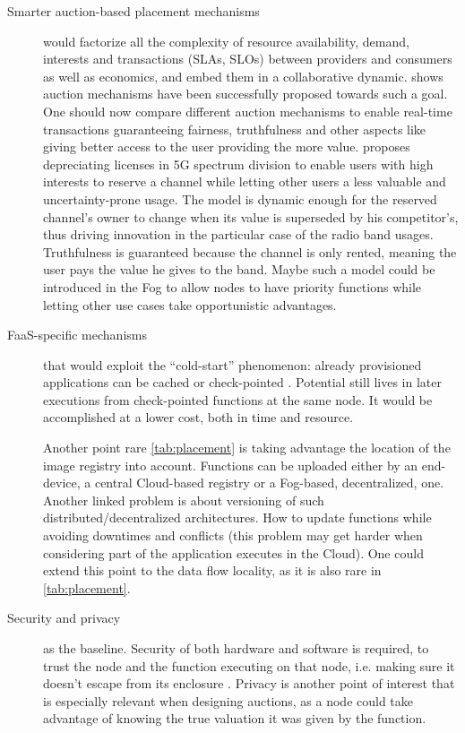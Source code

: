 \documentclass[11pt]{sdm}
\begin{document}
\begin{description}
	\item[Smarter auction-based placement mechanisms] would factorize all the complexity of resource availability, demand, interests and transactions (\glspl{SLA}, \glspl{SLO}) between providers and consumers as well as economics, and embed them in a collaborative dynamic.  shows auction mechanisms have been successfully proposed towards such a goal. One should now compare different auction mechanisms to enable real-time transactions guaranteeing fairness, truthfulness and other aspects like giving better access to the user providing the more value. \citet{milgrom_redesigning_2017} proposes depreciating licenses in 5G spectrum division to enable users with high interests to reserve a channel while letting other users a less valuable and uncertainty-prone usage. The model is dynamic enough for the reserved channel's owner to change when its value is superseded by his competitor's, thus driving innovation in the particular case of the radio band usages. Truthfulness is guaranteed because the channel is only rented, meaning the user pays the value he gives to the band. Maybe such a model could be introduced in the Fog to allow nodes to have priority functions while letting other use cases take opportunistic advantages.

	\item[\gls{FaaS}-specific mechanisms] that would exploit the ``cold-start'' phenomenon: already provisioned applications can be cached or check-pointed \cite{karhula_checkpointing_2019}. Potential still lives in later executions from check-pointed functions at the same node. It would be accomplished at a lower cost, both in time and resource.

	Another point rare \cref{tab:placement} is taking advantage the location of the image registry into account. Functions can be uploaded either by an end-device, a central Cloud-based registry or a Fog-based, decentralized, one. Another linked problem is about versioning of such distributed/decentralized architectures. How to update functions while avoiding downtimes and conflicts (this problem may get harder when considering part of the application executes in the Cloud). One could extend this point to the data flow locality, as it is also rare in \cref{tab:placement}.

	\item[Security and privacy] as the baseline. Security of both hardware and software is required, to trust the node and the function executing on that node, i.e. making sure it doesn't escape from its enclosure \cite{maurice_hello_2017}. Privacy is another point of interest that is especially relevant when designing auctions, as a node could take advantage of knowing the true valuation it was given by the function.
\end{description}
\end{document}
